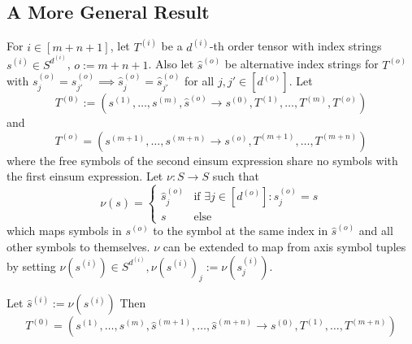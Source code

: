 \subsection{A More General Result}
\begin{theorem}
    For $i \in [m + n + 1]$, let $T^{(i)}$ be a $d^{(i)}$-th order tensor with index strings $s^{(i)} \in S^{d^{(i)}}$, $o := m + n + 1$.
    Also let $\hat{s}^{(o)}$ be alternative index strings for $T^{(o)}$ with $s^{(o)}_j = s^{(o)}_{j'} \implies \hat{s}^{(o)}_j = \hat{s}^{(o)}_{j'}$ for all $j, j' \in [d^{(o)}]$.
    Let
    $$T^{(0)} := (s^{(1)},\dots,s^{(m)}, \hat{s}^{(o)} \rightarrow s^{(0)}, T^{(1)},\dots,T^{(m)}, T^{(o)})$$
    and
    $$T^{(o)} = (s^{(m + 1)},\dots,s^{(m + n)} \rightarrow s^{(o)}, T^{(m + 1)},\dots,T^{(m + n)})$$
    where the free symbols of the second einsum expression share no symbols with the first einsum expression.
    Let $\nu: S \rightarrow S$ such that
    $$\nu(s) = \begin{cases}
            \hat{s}^{(o)}_j & \text{if }\exists j \in [d^{(o)}]: s^{(o)}_j = s \\
            s               & \text{else}
        \end{cases}$$
    which maps symbols in $s^{(o)}$ to the symbol at the same index in $\hat{s}^{(o)}$ and all other symbols to themselves.
    $\nu$ can be extended to map from axis symbol tuples by setting $\nu(s^{(i)}) \in S^{d^{(i)}}, \nu(s^{(i)})_j := \nu(s^{(i)}_j)$.

    Let $\hat{s}^{(i)} := \nu(s^{(i)})$
    Then
    $$T^{(0)} = (s^{(1)},\dots,s^{(m)}, \hat{s}^{(m + 1)}, \dots, \hat{s}^{(m + n)} \rightarrow s^{(0)}, T^{(1)},\dots,T^{(m + n)})$$
\end{theorem}
